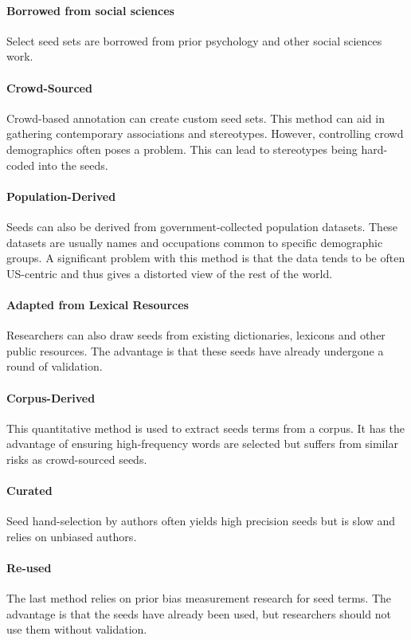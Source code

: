 \paragraph{Borrowed from social sciences} Select seed sets are borrowed from prior psychology and
other social sciences work.

\paragraph{Crowd-Sourced} Crowd-based annotation can create custom seed sets. This method can aid in
gathering contemporary associations and stereotypes. However, controlling crowd demographics often
poses a problem. This can lead to stereotypes being hard-coded into the seeds.

\paragraph{Population-Derived} Seeds can also be derived from government-collected population
datasets. These datasets are usually names and occupations common to specific demographic groups.
A significant problem with this method is that the data tends to be often US-centric and thus gives
a distorted view of the rest of the world.

\paragraph{Adapted from Lexical Resources} Researchers can also draw seeds from existing
dictionaries, lexicons and other public resources. The advantage is that these seeds have already
undergone a round of validation.

\paragraph{Corpus-Derived} This quantitative method is used to extract seeds terms from a corpus. It
has the advantage of ensuring high-frequency words are selected but suffers from similar risks as
crowd-sourced seeds.

\paragraph{Curated} Seed hand-selection by authors often yields high precision seeds but is slow and
relies on unbiased authors.

\paragraph{Re-used} The last method relies on prior bias measurement research for seed terms. The
advantage is that the seeds have already been used, but researchers should not use them without
validation.

